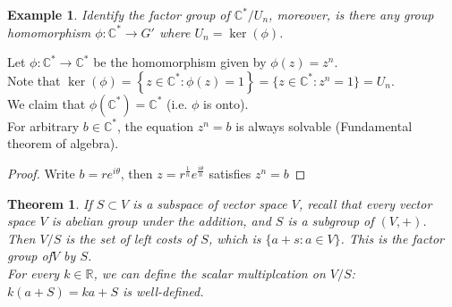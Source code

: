 \documentclass{article}
\theoremstyle{MyNonumberplain}
\theoremstyle{break}
\newtheorem*{proof}{Proof. }
\newcommand{\p}{\phi}
\theoremstyle{break}
\newtheorem{theorem}{Theorem}[section]
\newtheorem{example}{Example}[section]
\theoremstyle{break}
\theoremstyle{definition}
\theoremstyle{break}
\begin{document}
\begin{expbox}
    \begin{example}
        Identify the factor group of $\mathbb{C}^{\ast} / U_n$, moreover, is there any
        group homomorphism $\p : \mathbb{C}^{\ast} \rightarrow G'$ where $U_n = \ker
        \left( \p \right)$.
    \end{example}
    \begin{ansbox}
        Let $\p : \mathbb{C}^{\ast} \rightarrow \mathbb{C}^{\ast}$ be the homomorphism
        given by $\p (z) = z^n$.\\

        Note that $\ker \left( \p \right) = \left\{ z \in \mathbb{C}^{\ast} : \p (z)
        = 1 \right\} = \{ z \in \mathbb{C}^{\ast} : z^n = 1 \} = U_n$.\\

        We claim that $\p (\mathbb{C}^{\ast}) =\mathbb{C}^{\ast}$ (i.e. $\p$ is onto).\\

        For arbitrary $b \in \mathbb{C}^{\ast}$, the equation $z^n = b$ is always
        solvable (Fundamental theorem of algebra).
        \begin{prfbox}
            \begin{proof}
                Write $b = r e^{i \theta}$, then $z = r^{\frac{1}{n}} e^{\frac{i
                \theta}{n}}$ satisfies $z^n = b$
            \end{proof}
        \end{prfbox}
    \end{ansbox}
\end{expbox}

\begin{thmbox}
    \begin{theorem}
        If $S \subset V$ is a subspace of vector space $V$, recall that every vector
        space $V$ is abelian group under the addition, and $S$ is a subgroup of $(V,
        +)$.\\

        Then $V / S$ is the set of left costs of $S$, which is $\{ a + s : a \in V
        \}$. This is the factor group of\enspace$V$ by $S$.\\

        For every $k \in \mathbb{R}$, we can define the scalar multiplcation on $V /
        S$: $k (a + S) = k a + S$ is well-defined.
    \end{theorem}

\end{thmbox}
\end{document}
